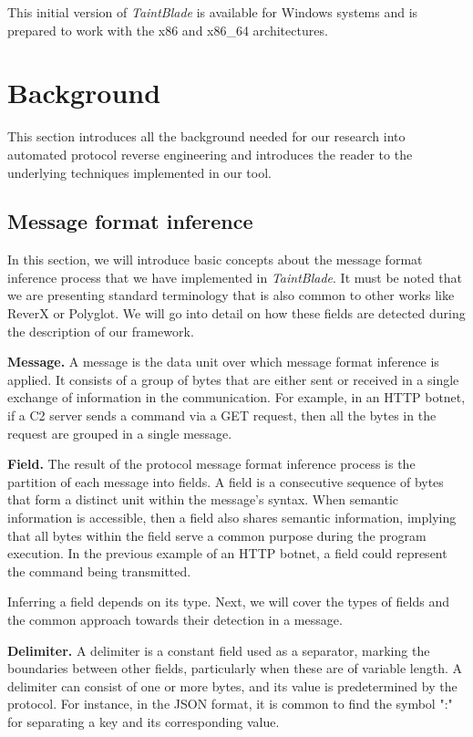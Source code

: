 \documentclass[conference]{IEEEtran}
\begin{document}
This initial version of \textit{TaintBlade} is available for Windows systems
and is prepared to work with the x86 and x86\_64 architectures.

\section{Background}
This section introduces all the background needed for our research into
automated protocol reverse engineering and introduces the reader to the
underlying techniques implemented in our tool.

\subsection{Message format inference}\label{subsec:msg_format_inference}
In this section, we will introduce basic concepts about the message format
inference process that we have implemented in \textit{TaintBlade}. It must be noted
that we are presenting standard terminology that is also common to other works
like ReverX\cite{github_pre_reverx} or Polyglot\cite{polyglot_caballero}.
We will go into detail on how these fields are detected during the description of our framework.

\textbf{Message.} A message is the data unit over which message format inference is applied. It
consists of a group of bytes that are either sent or received in a single exchange of information
in the communication. For example, in an HTTP botnet, if a C2 server sends a command via a GET request,
then all the bytes in the request are grouped in a single message.

\textbf{Field.} The result of the protocol message format inference process is the partition of each
message into fields. A field is a consecutive sequence of bytes that form a distinct unit within the message's syntax.
When semantic information is accessible, then a field also shares semantic information, implying that all bytes
within the field serve a common purpose during the program execution. In the previous example of an HTTP botnet,
a field could represent the command being transmitted.

Inferring a field depends on its type. Next, we will cover the types of fields
and the common approach towards their detection in a message.

\textbf{Delimiter.} A delimiter is a constant field used as a separator,
marking the boundaries between other fields, particularly when these
are of variable length. A delimiter can consist of one or more bytes,
and its value is predetermined by the protocol.
For instance, in the JSON format, it is common to find the symbol ":" for
separating a key and its corresponding value.
\end{document}
